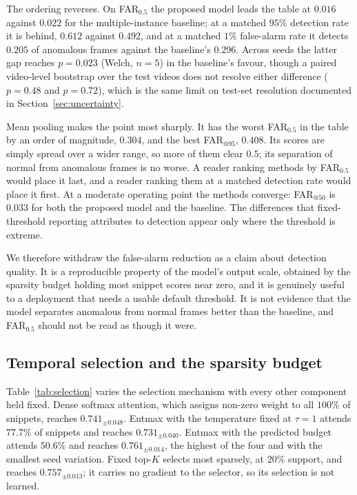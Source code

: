 \documentclass[11pt]{article}
\begin{document}
The ordering reverses. On FAR$_{0.5}$ the proposed model leads the table at
$0.016$ against $0.022$ for the multiple-instance baseline; at a matched $95\%$
detection rate it is behind, $0.612$ against $0.492$, and at a matched $1\%$
false-alarm rate it detects $0.205$ of anomalous frames against the baseline's
$0.296$. Across seeds the latter gap reaches $p=0.023$ (Welch, $n=5$) in the
baseline's favour, though a paired video-level bootstrap over the test videos
does not resolve either difference ($p=0.48$ and $p=0.72$), which is the same
limit on test-set resolution documented in Section~\ref{sec:uncertainty}.

Mean pooling makes the point most sharply. It has the worst FAR$_{0.5}$ in the
table by an order of magnitude, $0.304$, and the best FAR$_{@95}$, $0.408$. Its
scores are simply spread over a wider range, so more of them clear $0.5$; its
separation of normal from anomalous frames is no worse. A reader ranking methods
by FAR$_{0.5}$ would place it last, and a reader ranking them at a matched
detection rate would place it first. At a moderate operating point the methods
converge: FAR$_{@50}$ is $0.033$ for both the proposed model and the baseline.
The differences that fixed-threshold reporting attributes to detection appear
only where the threshold is extreme.

We therefore withdraw the false-alarm reduction as a claim about detection
quality. It is a reproducible property of the model's output scale, obtained by
the sparsity budget holding most snippet scores near zero, and it is genuinely
useful to a deployment that needs a usable default threshold. It is not evidence
that the model separates anomalous from normal frames better than the baseline,
and FAR$_{0.5}$ should not be read as though it were.

\subsection{Temporal selection and the sparsity budget}
\label{sec:selection}



Table~\ref{tab:selection} varies the selection mechanism with every other
component held fixed. Dense softmax attention, which assigns non-zero weight to
all $100\%$ of snippets, reaches $0.741_{\pm0.048}$. Entmax with the temperature
fixed at $\tau=1$ attends $77.7\%$ of snippets and reaches $0.731_{\pm0.040}$.
Entmax with the predicted budget attends $50.6\%$ and reaches $0.761_{\pm0.014}$,
the highest of the four and with the smallest seed variation. Fixed top-$K$
selects most sparsely, at $20\%$ support, and reaches $0.757_{\pm0.013}$; it
carries no gradient to the selector, so its selection is not learned.
\end{document}
